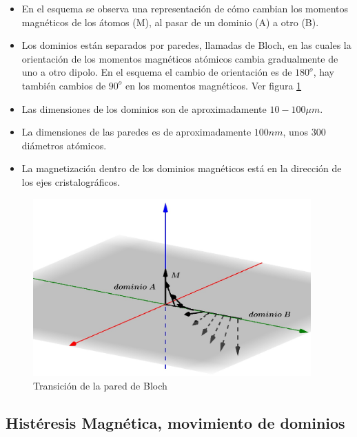 \begin{itemize}
	\item En el esquema se observa una representación de cómo cambian los momentos magnéticos de los átomos (M), al pasar de un dominio (A) a otro (B).
	
	\item Los dominios están separados por paredes, llamadas de Bloch, en las cuales la orientación de los momentos magnéticos atómicos cambia gradualmente de uno a otro dipolo. En el esquema el cambio de orientación es de $180^{o}$, hay también cambios de $90^{o}$ en los momentos magnéticos. Ver figura \ref{fig:dominioGrano3}

	\item Las dimensiones de los dominios son de aproximadamente $10-100 \mu m$.

	\item La dimensiones de las paredes es de aproximadamente $100nm$, unos $300$ diámetros atómicos.

	\item La magnetización dentro de los dominios magnéticos está en la dirección de los ejes cristalográficos.
\end{itemize}

\begin{figure}
	\centering
    \includegraphics[width=0.95\textwidth]{./Figures/dominio_grano3}
    \caption{Transición de la pared de Bloch}
    \label{fig:dominioGrano3}    
\end{figure}

\subsection{Histéresis Magnética, movimiento de dominios}


